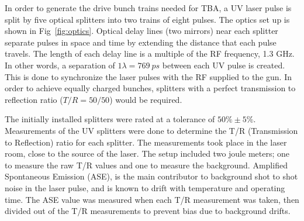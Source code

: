 \documentclass{iitthesis}
\begin{document}
In order to generate the drive bunch trains needed for TBA, a UV laser pulse is split 
by five optical splitters into two trains of eight pulses. 
The optics set up is shown in Fig~\ref{fig:optics}. Optical delay lines (two mirrors) near each splitter 
separate pulses in space and time by extending the distance that each pulse travels. 
The length of each delay line is a multiple of the RF frequency, 1.3 GHz. 
In other words, a separation of $1\lambda=\SI{769}{ps}$ between each UV pulse is created. 
This is done to synchronize the laser pulses with the RF supplied to the gun.
In order to achieve equally charged bunches, splitters with a perfect transmission 
to reflection ratio ($T/R = 50/50$) would be required.

The initially installed splitters were rated at a tolerance of $50\%\pm5\%$.
Measurements of the UV splitters were done to determine the T/R (Transmission to Reflection) ratio for 
each splitter. The measurements took place in the laser room, close to the source of the laser.
The setup included two joule meters; one to measure the raw T/R values and one to measure 
the background. Amplified Spontaneous Emission (ASE), 
is the main contributor to background shot to shot noise in the laser pulse,
and is known to drift with temperature and operating time. 
The ASE value was measured when each T/R measurement was taken, then divided out of the T/R 
measurements to prevent bias due to background drifts. 
\end{document}
